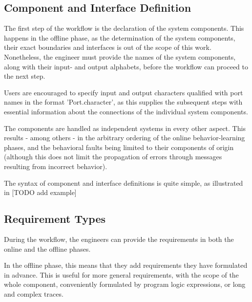 \subsection{Component and Interface Definition} \label{subs_compdef}
The first step of the workflow is the declaration of the system components. This happens in the offline phase, as the determination of the system components, their exact boundaries and interfaces is out of the scope of this work. Nonetheless, the engineer must provide the names of the system components, along with their input- and output alphabets, before the workflow can proceed to the next step.

Users are encouraged to specify input and output characters qualified with port names in the format 'Port.character', as this supplies the subsequent steps with essential information about the connections of the individual system components.

The components are handled as independent systems in every other aspect. This results - among others - in the arbitrary ordering of the online behavior-learning phases, and the behavioral faults being limited to their components of origin (although this does not limit the propagation of errors through messages resulting from incorrect behavior).

The syntax of component and interface definitions is quite simple, as illustrated in [TODO add example]

\subsection{Requirement Types} \label{subs_reqtypes}
During the workflow, the engineers can provide the requirements in both the online and the offline phases. 

In the offline phase, this means that they add requirements they have formulated in advance. This is useful for more general requirements, with the scope of the whole component, conveniently formulated by program logic expressions, or long and complex traces.

